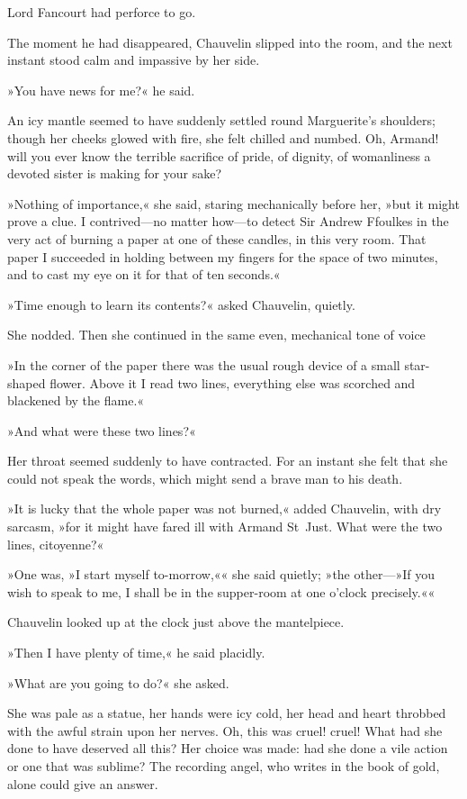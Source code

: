 Lord Fancourt had perforce to go.

The moment he had disappeared, Chauvelin slipped into the room, and the next instant stood calm and impassive by her side.

»You have news for me?« he said.

An icy mantle seemed to have suddenly settled round Marguerite's shoulders; though her cheeks glowed with fire, she felt chilled and numbed. Oh, Armand! will you ever know the terrible sacrifice of pride, of dignity, of womanliness a devoted sister is making for your sake?

»Nothing of importance,« she said, staring mechanically before her, »but it might prove a clue. I contrived\allowbreak---\allowbreak no matter how\allowbreak---\allowbreak to detect Sir Andrew Ffoulkes in the very act of burning a paper at one of these candles, in this very room. That paper I succeeded in holding between my fingers for the space of two minutes, and to cast my eye on it for that of ten seconds.«

»Time enough to learn its contents?« asked Chauvelin, quietly.

She nodded. Then she continued in the same even, mechanical tone of voice\longdash


»In the corner of the paper there was the usual rough device of a small star-shaped flower. Above it I read two lines, everything else was scorched and blackened by the flame.«

»And what were these two lines?«

Her throat seemed suddenly to have contracted. For an instant she felt that she could not speak the words, which might send a brave man to his death.

»It is lucky that the whole paper was not burned,« added Chauvelin, with dry sarcasm, »for it might have fared ill with Armand St~Just. What were the two lines, citoyenne?«

»One was, »I start myself to-morrow,«« she said quietly; »the other\allowbreak---\allowbreak »If you wish to speak to me, I shall be in the supper-room at one o'clock precisely.««

Chauvelin looked up at the clock just above the mantelpiece.

»Then I have plenty of time,« he said placidly.

»What are you going to do?« she asked.

She was pale as a statue, her hands were icy cold, her head and heart throbbed with the awful strain upon her nerves. Oh, this was cruel! cruel! What had she done to have deserved all this? Her choice was made: had she done a vile action or one that was sublime? The recording angel, who writes in the book of gold, alone could give an answer.

